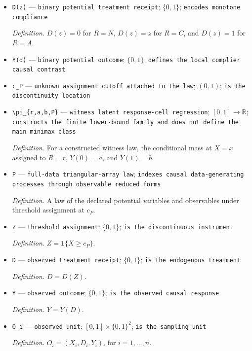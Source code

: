 \documentclass{article}
\begin{document}
\begin{itemize}
  \item \texttt{D(z)} --- \texttt{binary potential treatment receipt}; \(\{0,1\}\); \texttt{encodes monotone compliance}
  \par\smallskip\noindent\emph{Definition.} \(D(z)=0\) for \(R=N\), \(D(z)=z\) for \(R=C\), and \(D(z)=1\) for \(R=A\).
  \item \texttt{Y(d)} --- \texttt{binary potential outcome}; \(\{0,1\}\); \texttt{defines the local complier causal contrast}
  \item \texttt{c\_\allowbreak{}P} --- \texttt{unknown assignment cutoff attached to the law}; \((0,1)\); \texttt{is the discontinuity location}
  \item \texttt{\textbackslash{}\allowbreak{}pi\_\allowbreak{}\{r,\allowbreak{}a,\allowbreak{}b,\allowbreak{}P\}\allowbreak{}} --- \texttt{witness latent response-\allowbreak{}cell regression}; \([0,1]\to\mathbb R\); \texttt{constructs the finite lower-\allowbreak{}bound family and does not define the main minimax class}
  \par\smallskip\noindent\emph{Definition.} For a constructed witness law, the conditional mass at \(X=x\) assigned to \(R=r\), \(Y(0)=a\), and \(Y(1)=b\).
  \item \texttt{P} --- \texttt{full-\allowbreak{}data triangular-\allowbreak{}array law}; \texttt{indexes causal data-\allowbreak{}generating processes through observable reduced forms}
  \par\smallskip\noindent\emph{Definition.} A law of the declared potential variables and observables under threshold assignment at \(c_P\).
  \item \texttt{Z} --- \texttt{threshold assignment}; \(\{0,1\}\); \texttt{is the discontinuous instrument}
  \par\smallskip\noindent\emph{Definition.} \(Z=\mathbf 1\{X\ge c_P\}\).
  \item \texttt{D} --- \texttt{observed treatment receipt}; \(\{0,1\}\); \texttt{is the endogenous treatment}
  \par\smallskip\noindent\emph{Definition.} \(D=D(Z)\).
  \item \texttt{Y} --- \texttt{observed outcome}; \(\{0,1\}\); \texttt{is the observed causal response}
  \par\smallskip\noindent\emph{Definition.} \(Y=Y(D)\).
  \item \texttt{O\_\allowbreak{}i} --- \texttt{observed unit}; \([0,1]\times\{0,1\}^2\); \texttt{is the sampling unit}
  \par\smallskip\noindent\emph{Definition.} \(O_i=(X_i,D_i,Y_i)\), for \(i=1,\ldots,n\).

\end{itemize}
\end{document}
